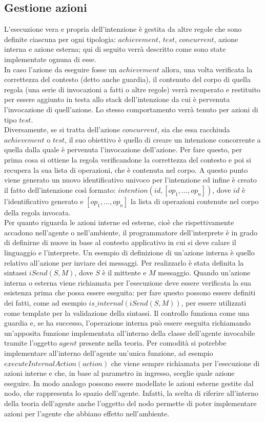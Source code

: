 \subsection{Gestione azioni}\label{sctn:GestioneAzioni}
L'esecuzione vera e propria dell'intenzione è gestita da altre regole che sono definite ciascuna per ogni tipologia: $achievement$, $test$, $concurrent$, azione interna e azione esterna; qui di seguito verrà descritto come sono state implementate ognuna di esse.
\\
In caso l'azione da eseguire fosse un $achievement$ allora, una volta verificata la correttezza del contesto (detto anche guardia), il contenuto del corpo di quella regola (una serie di invocazioni a fatti o altre regole) verrà recuperato e restituito per essere aggiunto in testa allo stack dell'intenzione da cui è pervenuta l'invocazione di quell'azione. Lo stesso comportamento verrà tenuto per azioni di tipo $test$.
\\
Diversamente, se si tratta dell'azione $concurrent$, sia che essa racchiuda $achievement$ o $test$, il suo obiettivo è quello di creare un intenzione concorrente a quella dalla quale è pervenuta l'invocazione dell'azione. Per fare questo, per prima cosa si ottiene la regola verificandone la correttezza del contesto e poi si recupera la sua lista di operazioni, che è contenuta nel corpo.
A questo punto viene generato un nuovo identificativo univoco per l'intenzione ed infine è creato il fatto dell'intenzione così formato: $intention(id, [op_1, \ldots, op_n])$, dove $id$ è l'identificativo generato e $[op_1, \ldots, op_n]$ la lista di operazioni contenute nel corpo della regola invocata.
\\
Per quanto riguarda le azioni interne ed esterne, cioè che rispettivamente accadono nell'agente o nell'ambiente, il programmatore dell'interprete è in grado di definirne di nuove in base al contesto applicativo in cui si deve calare il linguaggio e l'interprete. Un esempio di definizione di un'azione interna è quello relativo all'azione per inviare dei messaggi. Per realizzarlo è stata definita la sintassi $iSend(S,M)$, dove $S$ è il mittente e $M$ messaggio. Quando un'azione interna o esterna viene richiamata per l'esecuzione deve essere verificata la sua esistenza prima che possa essere eseguita: per fare questo possono essere definiti dei fatti, come ad esempio $is\_internal(iSend(S,M))$, per essere utilizzati come template per la validazione della sintassi. Il controllo funziona come una guardia e, se ha successo, l'operazione interna può essere eseguita richiamando un'apposita funzione implementata all'interno della classe dell'agente invocabile tramite l'oggetto $agent$ presente nella teoria. Per comodità si potrebbe implementare all'interno dell'agente un'unica funzione, ad esempio $executeInternalAction(action)$ che viene sempre richiamata per l'esecuzione di azioni interne e che, in base al parametro in ingresso, sceglie quale azione eseguire.
In modo analogo possono essere modellate le azioni esterne gestite dal nodo, che rappresenta lo spazio dell'agente. Infatti, la scelta di riferire all'interno della teoria dell'agente anche l'oggetto del nodo permette di poter implementare azioni per l'agente che abbiano effetto nell'ambiente.

